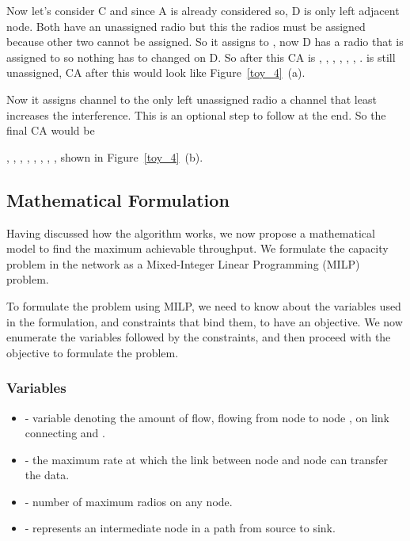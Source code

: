 \documentclass[conference]{IEEEtran}
\begin{document}
Now let's consider C  and since A is already considered so, D is only left adjacent node.
Both have an unassigned radio but this the  radios must be assigned  because other two cannot be assigned. 
So it assigns  to , now D has a radio that is assigned to  so nothing has to changed on D. So after this CA is
  ,    , 
  ,    , 
  ,    , 
  .  is still unassigned, CA after this would look like Figure~\ref{toy_4}~(a). 

Now it assigns channel to the only left unassigned radio a channel that least increases the interference. This is an optional step to follow at the end. So the final CA would be

  ,    , 
  ,    , 
  ,    , 
  ,    , shown in Figure~\ref{toy_4}~(b).



\subsection{Mathematical Formulation}
Having discussed how the algorithm works, we now propose a mathematical model to find the maximum achievable throughput.
We formulate the capacity problem in the  network as a Mixed-Integer Linear Programming (MILP) problem.

To formulate the problem using MILP, we need to know  about the variables used in the formulation, and constraints that bind them, to have an objective.
We now enumerate the variables followed by the constraints, and then proceed with the objective to formulate the problem.


\subsubsection{Variables}
  \begin{itemize}
      \item  - variable denoting the amount of flow, flowing from node  to node , on link connecting  and .
      \item  - the maximum rate at which the link between node  and node  can transfer the data.
      \item  - number of maximum radios on any node.
      \item  - represents an intermediate node in a path from source to sink.
      
 \end{itemize}
\end{document}
